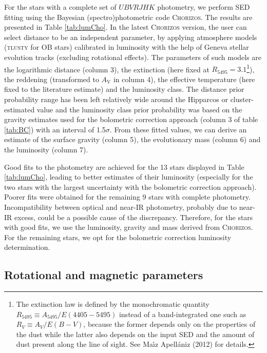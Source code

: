 \documentclass[useAMS,usenatbib]{mn2e}
\begin{document}
For the stars with a complete set of $UBVRJHK$ photometry, we perform SED fitting using the Bayesian (spectro)photometric code \textsc{Chorizos}. The results are presented in Table \ref{tab:lumCho}.  
In the latest \textsc{Chorizos} version, the user can select distance to be an independent parameter, by applying atmosphere models (\textsc{tlusty} for OB stars) calibrated in luminosity with the help of Geneva stellar evolution tracks (excluding rotational effects).  
The parameters of such models are the logarithmic distance (column 3), the extinction (here fixed at $R_{5495}=3.1$\footnote{The extinction law is defined by the monochromatic quantity $R_{5495} \equiv A_{5495}/E(4405-5495)$ instead of a band-integrated one such as $R_{V} \equiv A_{V}/E(B-V)$, because the former depends only on the properties of the dust while the latter also depends on the input SED and the amount of dust present along the line of sight. See Ma\'{\i}z Apell\'aniz (2012) for details.}), the reddening (transformed to $A_\mathrm{V}$ in column 4), the effective temperature (here fixed to the literature estimate) and the luminosity class. 
The distance prior probability range has been left relatively wide around the Hipparcos or cluster-estimated value and the luminosity class prior probability was based on the gravity estimates used for the bolometric correction approach (column 3 of table \ref{tab:BC}) with an interval of 1.5$\sigma$.
From these fitted values, we can derive an estimate of the surface gravity (column 5), the evolutionary mass 
(column 6) and the luminosity (column 7). 



Good fits to the photometry are achieved for the 13 stars displayed in Table \ref{tab:lumCho}, leading to better estimates of their luminosity (especially for the two stars with the largest uncertainty with the bolometric correction approach). 
Poorer fits were obtained for the remaining 9 stars with complete photometry.  
Incompatibility between optical and near-IR photometry, probably due to near-IR excess, could be a possible cause of the discrepancy. 
Therefore, for the stars with good fits, we use the luminosity, gravity and mass derived from \textsc{Chorizos}. 
For the remaining stars, we opt for the bolometric correction luminosity determination. 

 



\subsection{Rotational and magnetic parameters}
\label{sec:rb}
\end{document}
